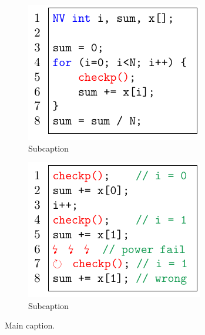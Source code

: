 \begin{figure}
    \begin{subfigure}{0.49\columnwidth}
        \includegraphics[width=\columnwidth]{figures/war-example.pdf}
        \caption{Subcaption}
        \label{fig:war-example}
    \end{subfigure}
    \begin{subfigure}{0.49\columnwidth}
        \includegraphics[width=\columnwidth]{figures/war-execution.pdf}
        \caption{Subcaption}
        \label{fig:war-execution}
    \end{subfigure}
    \caption{Main caption.}
    \label{fig:war}
\end{figure}

